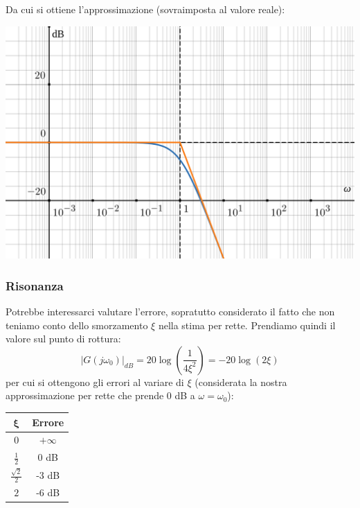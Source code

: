 \documentclass[a4paper,11pt]{article}
\begin{document}
\par\medskip

\noindent
\begin{minipage}{\textwidth}
Da cui si ottiene l'approssimazione (sovraimposta al valore reale):
\begin{center}
	\includegraphics[scale=0.3]{../figures/order2_bode/clean_mod.png}
\end{center}
\end{minipage}

\par\medskip

\subsubsection{Risonanza}
Potrebbe interessarci valutare l'errore, sopratutto considerato il fatto che non teniamo conto dello smorzamento $\xi$ nella stima per rette.
Prendiamo quindi il valore sul punto di rottura:
$$
|G(j\omega_0)|_{dB} = 20 \log \left( \frac{1}{4 \xi^2} \right) = -20 \log\left( 2 \xi \right) 
$$
per cui si ottengono gli errori al variare di $\xi$ (considerata la nostra approssimazione per rette che prende 0 dB a $\omega = \omega_0$):
\begin{table}[h!]
	\center {}
	\begin{tabular} { c | c }
		$\mathbf{\xi}$ & \bfseries Errore \\ 
		\hline
		$0$ & $+\infty$ \\
		$\frac{1}{2}$ & 0 dB \\
		$\frac{\sqrt{2}}{2}$ & -3 dB \\
		$2$ & -6 dB \\
	\end{tabular}
\end{table}
\end{document}
